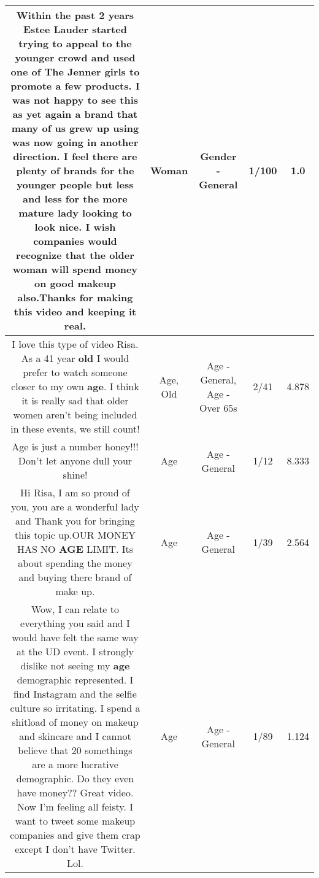 \documentclass[11pt]{article}
\newlength\mylength
\begin{document}
\begin{center}
\begin{longtable}{|C{.65\mylength}|C{.30\mylength}|C{.12\mylength}|C{.12\mylength}|C{.12\mylength}|}
  \small Within the past 2 years Estee Lauder started trying to appeal to the younger crowd and used one of The Jenner girls to promote a few products. I was not happy to see this as yet again a brand that many of us grew up using was now going in another direction. I feel there are plenty of brands for the younger people but less and less for the more mature lady looking to look nice. I wish companies would recognize that the older \textbf{woman} will spend money on good makeup also.Thanks for making this video and keeping it real.\normalsize   & Woman & Gender - General & 1/100 & 1.0 \\  \hline
  \small I love this type of video Risa. As a 41 year \textbf{old} I would prefer to watch someone closer to my own \textbf{age}. I think it is really sad that older women aren't being included in these events, we still count!\normalsize   & Age, Old & Age - General, Age - Over 65s & 2/41 & 4.878 \\  \hline
  \small Age is just a number honey!!! Don't let anyone dull your shine!\normalsize   & Age & Age - General & 1/12 & 8.333 \\  \hline
  \small Hi Risa, I am so proud of you,  you are a wonderful lady and Thank you for bringing this topic up.OUR MONEY HAS NO \textbf{AGE} LIMIT. Its about spending the money and buying there brand of make up.\normalsize   & Age & Age - General & 1/39 & 2.564 \\  \hline
  \small Wow, I can relate to everything you said and I would have felt the same way at the UD event. I strongly dislike not seeing my \textbf{age} demographic represented. I find Instagram and the selfie culture so irritating. I spend a shitload of money on makeup and skincare and I cannot believe that 20 somethings are a more lucrative demographic. Do they even have money?? Great video. Now I'm feeling all feisty. I want to tweet some makeup companies and give them crap except I don't have Twitter. Lol.\normalsize   & Age & Age - General & 1/89 & 1.124 \\  \hline

\end{longtable}
\end{center}
\end{document}

